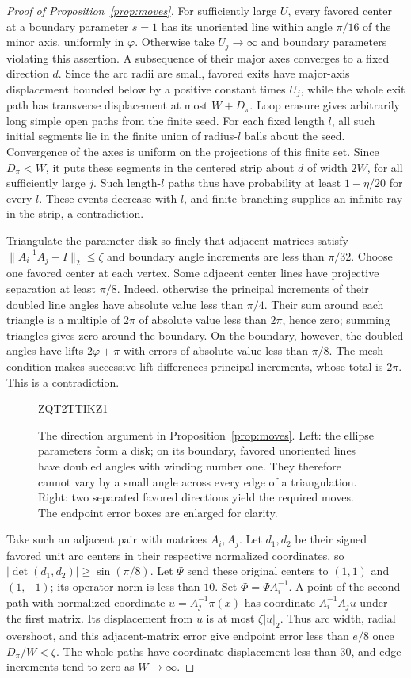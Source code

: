 \documentclass[11pt]{article}
\theoremstyle{definition}
\begin{document}
\begin{proof}[Proof of Proposition~\ref{prop:moves}]
For sufficiently large $U$, every favored center at a boundary
parameter $s=1$ has its unoriented line within angle $\pi/16$ of the
minor axis, uniformly in $\varphi$. Otherwise take $U_j\to\infty$
and boundary parameters violating this assertion. A subsequence of
their major axes converges to a fixed direction $d$. Since the arc
radii are small, favored exits have major-axis displacement bounded
below by a positive constant times $U_j$, while the whole exit path
has transverse displacement at most $W+D_\pi$. Loop erasure gives
arbitrarily long simple open paths from the finite seed. For each
fixed length $l$, all such initial segments lie in the finite union
of radius-$l$ balls about the seed. Convergence of the axes is uniform
on the projections of this finite set. Since $D_\pi<W$, it puts
these segments in the centered strip about $d$ of width $2W$, for
all sufficiently large $j$. Such length-$l$ paths thus have probability at least
$1-\eta/20$ for every $l$. These events decrease with $l$, and finite
branching supplies an infinite ray in the strip, a contradiction.

Triangulate the parameter disk so finely that adjacent matrices
satisfy $\|A_i^{-1}A_j-I\|_2\le\zeta$ and boundary angle increments
are less than $\pi/32$. Choose one favored center at each vertex.
Some adjacent center lines have projective separation at least
$\pi/8$. Indeed, otherwise the principal increments of their doubled
line angles have absolute value less than $\pi/4$. Their sum around
each triangle is a multiple of $2\pi$ of absolute value less than
$2\pi$, hence zero; summing triangles gives zero around the boundary.
On the boundary, however, the doubled angles have lifts
$2\varphi+\pi$ with errors of absolute value less than $\pi/8$.
The mesh condition makes successive lift differences principal
increments, whose total is $2\pi$. This is a contradiction.

\begin{figure}[htbp]

ZQT2TTIKZ1
\caption{The direction argument in Proposition~\ref{prop:moves}.
Left: the ellipse parameters form a disk; on its boundary, favored
unoriented lines have doubled angles with winding number one.
They therefore cannot vary by a small angle across every edge of
a triangulation. Right: two separated favored directions yield
the required moves. The endpoint error boxes are enlarged for clarity.}
\label{fig:moves}
\end{figure}


Take such an adjacent pair with matrices $A_i,A_j$. Let $d_1,d_2$
be their signed favored unit arc centers in their respective normalized
coordinates, so $|\det(d_1,d_2)|\ge\sin(\pi/8)$. Let $\Psi$ send
these original centers to $(1,1)$ and $(1,-1)$; its operator norm is
less than $10$. Set $\Phi=\Psi A_i^{-1}$. A point of the second path
with normalized coordinate $u=A_j^{-1}\pi(x)$ has coordinate
$A_i^{-1}A_j u$ under the first matrix. Its displacement from $u$
is at most $\zeta|u|_2$. Thus arc width, radial overshoot, and this
adjacent-matrix error give endpoint error less than $e/8$ once
$D_\pi/W<\zeta$. The whole paths have coordinate displacement less
than $30$, and edge increments tend to zero as $W\to\infty$.


\end{proof}
\end{document}
